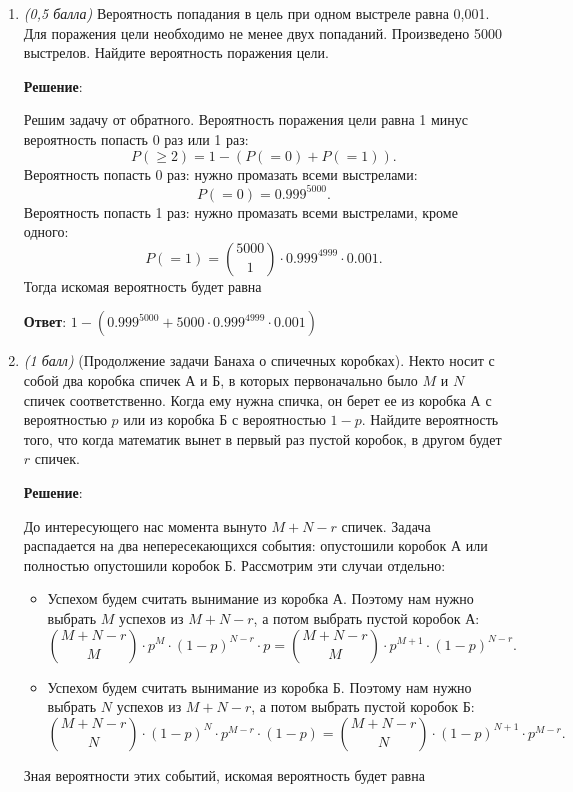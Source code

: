 \documentclass{article}
\begin{document}
\begin{enumerate}

    \item \textit{(0,5 балла)} Вероятность попадания в цель при одном выстреле равна 0,001. Для поражения цели необходимо не менее двух попаданий. Произведено 5000 выстрелов. Найдите вероятность поражения цели.
    
    \textbf{Решение}:

    Решим задачу от обратного. Вероятность поражения цели равна 1 минус вероятность попасть 0 раз или 1 раз:
    \begin{equation}
        P(\geq 2) = 1 - (P(=0) + P(=1)).
    \end{equation}
    Вероятность попасть 0 раз: нужно промазать всеми выстрелами:
    \begin{equation}
        P(=0) = 0.999^{5000}.
    \end{equation}
    Вероятность попасть 1 раз: нужно промазать всеми выстрелами, кроме одного:
    \begin{equation}
        P(=1) = \binom{5000}{1} \cdot 0.999^{4999} \cdot 0.001.
    \end{equation}
    Тогда искомая вероятность будет равна

    \textbf{Ответ}:
    $1 - (0.999^{5000} + 5000 \cdot 0.999^{4999} \cdot 0.001)$
    
    \item \textit{(1 балл)} (Продолжение задачи Банаха о спичечных коробках). Некто носит с собой два коробка спичек А и Б, в которых первоначально было $M$ и $N$ спичек соответственно. Когда ему нужна спичка, он берет ее из коробка А с вероятностью $p$ или из коробка Б с вероятностью $1-p$. Найдите вероятность того, что когда математик вынет в первый раз пустой коробок, в другом будет $r$ спичек.
    
    \textbf{Решение}:

    До интересующего нас момента вынуто $M+N-r$ спичек. Задача распадается на два непересекающихся события: опустошили коробок А или полностью опустошили коробок Б. Рассмотрим эти случаи отдельно:
    \begin{itemize}
        \item Успехом будем считать вынимание из коробка А. Поэтому нам нужно выбрать $M$ успехов из $M+N-r$, а потом выбрать пустой коробок А:
        \begin{equation}
            \binom{M+N-r}{M} \cdot p^M \cdot (1-p)^{N-r} \cdot p = \binom{M+N-r}{M} \cdot p^{M+1} \cdot (1-p)^{N-r}.
        \end{equation}
        \item Успехом будем считать вынимание из коробка Б. Поэтому нам нужно выбрать $N$ успехов из $M+N-r$, а потом выбрать пустой коробок Б:
        \begin{equation}
            \binom{M+N-r}{N} \cdot (1-p)^N \cdot p^{M-r} \cdot (1-p) = \binom{M+N-r}{N} \cdot (1-p)^{N+1} \cdot p^{M-r}.
        \end{equation}
    \end{itemize}
    Зная вероятности этих событий, искомая вероятность будет равна


\end{enumerate}
\end{document}
